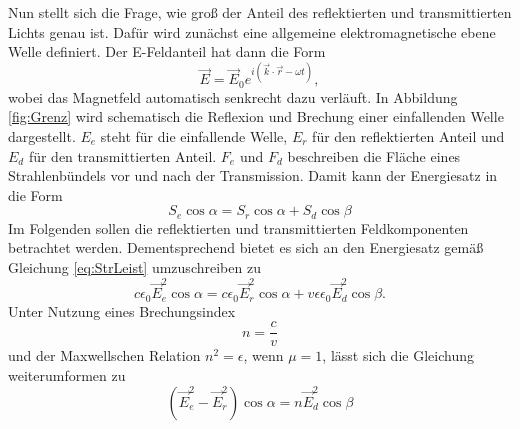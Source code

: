 \noindent Nun stellt sich die Frage, wie groß der Anteil des reflektierten und transmittierten Lichts genau ist.
Dafür wird zunächst eine allgemeine elektromagnetische ebene Welle definiert.
Der E-Feldanteil hat dann die Form 
\begin{equation}
    \vec{E}=\vec{E}_0e^{i\left(\vec{k}\cdot\vec{r}-\omega t\right)},
    \label{eq:ebeneW}
\end{equation}
wobei das Magnetfeld automatisch senkrecht dazu verläuft. In Abbildung \ref{fig:Grenz} wird
schematisch die Reflexion und Brechung einer einfallenden Welle dargestellt. $E_e$ steht für die einfallende Welle,
$E_r$ für den reflektierten Anteil und $E_d$ für den transmittierten Anteil. $F_e$ und $F_d$ beschreiben die Fläche eines Strahlenbündels vor 
und nach der Transmission. Damit kann der Energiesatz in die Form
\begin{equation}   
    S_e\cos{\alpha}=S_r \cos{\alpha}+S_d\cos{\beta}
    \label{eq:Energie}
\end{equation}
Im Folgenden sollen die reflektierten und transmittierten Feldkomponenten betrachtet werden. Dementsprechend
bietet es sich an den Energiesatz gemäß Gleichung \eqref{eq:StrLeist} umzuschreiben zu
\begin{equation*}   
    c\epsilon_0\vec{E}_e^2\cos{\alpha}=c\epsilon_0\vec{E}_r^2\cos{\alpha}+v\epsilon\epsilon_0\vec{E}_d^2\cos{\beta}.
    \label{eq:Energie}
\end{equation*}
Unter Nutzung eines Brechungsindex
\begin{equation}
    n=\frac{c}{v}
    \label{eq:n}
\end{equation}
und der Maxwellschen Relation $n^2=\epsilon$, wenn $\mu=1$, lässt sich die Gleichung weiterumformen zu
\begin{equation}
    \left(\vec{E}_e^2-\vec{E}_r^2\right)\cos{\alpha}=n\vec{E}_d^2\cos{\beta}
    \label{eq:Intensrelation}
\end{equation}

